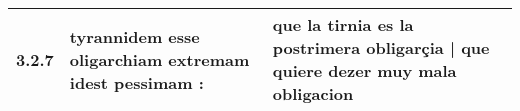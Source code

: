 \begin{tabular}{|p{1cm}|p{6.5cm}|p{6.5cm}|}

\hline
3.2.7 & tyrannidem esse oligarchiam extremam idest pessimam : & que la tirnia es la postrimera obligarçia | que quiere dezer muy mala obligacion \\\hline

\end{tabular}
